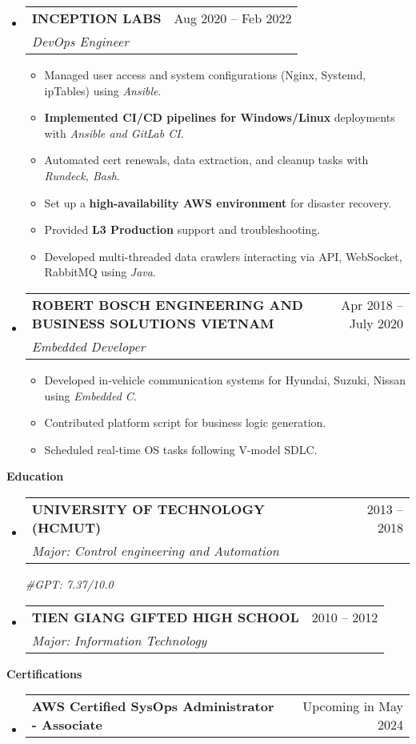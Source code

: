 \documentclass[letterpaper,12pt]{article}[leftmargin=*]
\makeatletter
\def \entryspacing {5pt}
\renewcommand{\section}[2]{\vspace{5pt}
  \colorbox{secondary}{\color{white}\raggedbottom\normalsize\textbf{{#1}{\hspace{7pt}#2}}}
}
\newcommand{\resumeEntryStart}{\begin{itemize}[leftmargin=2.5mm]}
\newcommand{\resumeEntryEnd}{\end{itemize}\vspace{\entryspacing}}
\newcommand{\resumeItemListStart}{\begin{itemize}[leftmargin=4.5mm]}
\newcommand{\resumeItemListEnd}{\end{itemize}}
\newcommand{\resumeItem}[1]{
  \item\small{
    {#1 \vspace{-2pt}}
  }
}
\newcommand{\resumeEntryTSDL}[4]{
  \vspace{-1pt}\item[]
    \begin{tabularx}{0.97\textwidth}{X@{\hspace{60pt}}r}
      \textbf{\color{primary}#1} & {\firabook\color{accent}\small#2} \\
      \textit{\color{accent}\small#3} & {\firabook\color{accent}\small#4} \\
    \end{tabularx}\vspace{-6pt}
}
\newcommand{\resumeEntryTD}[2]{
  \vspace{1pt}\item[]
    \begin{tabularx}{0.97\textwidth}{X@{\hspace{60pt}}r}
      \textbf{\color{primary}#1} & {\firabook\color{accent}\small#2} \\
    \end{tabularx}\vspace{-6pt}
}
\makeatother
\begin{document}
  \resumeEntryStart
    \resumeEntryTSDL
      {INCEPTION LABS}{Aug 2020 -- Feb 2022}
      {DevOps Engineer}{}
    \resumeItemListStart
      \resumeItem {Managed user access and system configurations (Nginx, Systemd, ipTables) using \textit{Ansible}.}
      \resumeItem {\textbf{Implemented CI/CD pipelines for Windows/Linux} deployments with \textit{Ansible and GitLab CI}.}
      \resumeItem {Automated cert renewals, data extraction, and cleanup tasks with \textit{Rundeck, Bash}.}
      \resumeItem {Set up a \textbf{high-availability AWS environment} for disaster recovery.}
      \resumeItem {Provided \textbf{L3 Production} support and troubleshooting.}
      \resumeItem {Developed multi-threaded data crawlers interacting via API, WebSocket, RabbitMQ using \textit{Java}.}
    \resumeItemListEnd
  \resumeEntryEnd

  \resumeEntryStart
    \resumeEntryTSDL
      {ROBERT BOSCH ENGINEERING AND BUSINESS SOLUTIONS VIETNAM}{Apr 2018 -- July 2020}
      {Embedded Developer}{}
    \resumeItemListStart
      \resumeItem {Developed in-vehicle communication systems for Hyundai, Suzuki, Nissan using \textit{Embedded C}.}
      \resumeItem {Contributed platform script for business logic generation.}
      \resumeItem {Scheduled real-time OS tasks following V-model SDLC.}
    \resumeItemListEnd
  \resumeEntryEnd

  \section{\faGraduationCap}{Education}
    \resumeEntryStart
      \resumeEntryTSDL
        {UNIVERSITY OF TECHNOLOGY (HCMUT)}{2013 -- 2018}
        {Major: Control engineering and Automation}{\vspace{5pt}}
        \textit{\color{accent}\small#GPT: 7.37/10.0}
      \resumeEntryTSDL
        {TIEN GIANG GIFTED HIGH SCHOOL}{2010 -- 2012}
        {Major: Information Technology}{}
  \resumeEntryEnd


\section{\faAward}{Certifications}
  \resumeEntryStart
    \resumeEntryTD
      {AWS Certified SysOps Administrator - Associate}{Upcoming in May 2024}
  \resumeEntryEnd
  \vspace{-20pt}
  
\end{document}
